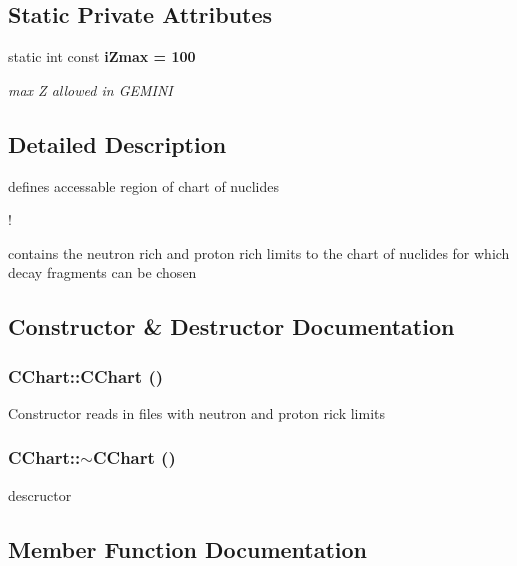 \subsection*{Static Private Attributes}
\begin{CompactItemize}
\item 
static int const \bf{i\-Zmax} = 100\label{classCChart_2ae54c9323a890abd5e496e42a1332ec}

\begin{CompactList}\small\item\em max Z allowed in GEMINI \item\end{CompactList}\end{CompactItemize}


\subsection{Detailed Description}
defines accessable region of chart of nuclides 

!

contains the neutron rich and proton rich limits to the chart of nuclides for which decay fragments can be chosen 



\subsection{Constructor \& Destructor Documentation}
\subsubsection{\setlength{\rightskip}{0pt plus 5cm}CChart::CChart ()}\label{classCChart_5487e6755d174a556cf9705ea69ceb1d}


Constructor reads in files with neutron and proton rick limits 
\subsubsection{\setlength{\rightskip}{0pt plus 5cm}CChart::$\sim$CChart ()}\label{classCChart_66890c06bca14a03b2e44d312a77d86a}


descructor 

\subsection{Member Function Documentation}
